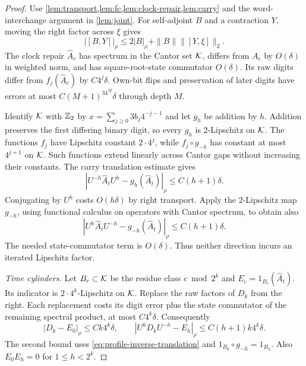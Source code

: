 \begin{proof}
Use \cref{lem:transport,lem:fc,lem:clock-repair,lem:carry} and the word-interchange argument in \cref{lem:joint}. For self-adjoint $B$ and a contraction $Y$, moving the right factor across $\xi$ gives
\[
 |[B,Y]|_\rho\le2|B|_\rho+\|B\|\|[Y,\xi]\|_2.
\]
The clock repair $\widehat A_c$ has spectrum in the Cantor set $\mathcal K$, differs from $A_c$ by $O(\delta)$ in weighted norm, and has square-root-state commutator $O(\delta)$. Its raw digits differ from $f_j(\widehat A_c)$ by $C4^j\delta$. Own-bit flips and preservation of later digits have errors at most $C(M+1)^34^M\delta$ through depth $M$.

Identify $\mathcal K$ with $\mathbb Z_2$ by $x=\sum_{j\ge0}3b_j4^{-j-1}$ and let $g_h$ be addition by $h$. Addition preserves the first differing binary digit, so every $g_h$ is 2-Lipschitz on $\mathcal K$. The functions $f_j$ have Lipschitz constant $2\cdot4^j$, while $f_j\circ g_{-h}$ has constant at most $4^{j+1}$ on $\mathcal K$. Such functions extend linearly across Cantor gaps without increasing their constants. The carry translation estimate gives
\[
 |U^{-h}\widehat A_tU^h-g_h(\widehat A_t)|_\rho\le C(h+1)\delta.
\]
Conjugating by $U^h$ costs $O(h\delta)$ by right transport. Apply the 2-Lipschitz map $g_{-h}$, using functional calculus on operators with Cantor spectrum, to obtain also
\begin{equation}\label{eq:profile-inverse-translation}
 |U^h\widehat A_tU^{-h}-g_{-h}(\widehat A_t)|_\rho\le C(h+1)\delta.
\end{equation}
The needed state-commutator term is $O(\delta)$. Thus neither direction incurs an iterated Lipschitz factor.

\par\smallskip\noindent\textit{Time cylinders.}\quad
Let $B_c\subset\mathcal K$ be the residue class $c\bmod2^k$ and $E_c=1_{B_c}(\widehat A_t)$. Its indicator is $2\cdot4^k$-Lipschitz on $\mathcal K$. Replace the raw factors of $D_k$ from the right. Each replacement costs its digit error plus the state commutator of the remaining spectral product, at most $C4^k\delta$. Consequently
\begin{equation}\label{eq:profile-time-cylinders}
 |D_k-E_0|_\rho\le Ck4^k\delta,\qquad
 |U^hD_kU^{-h}-E_h|_\rho\le C(h+1)k4^k\delta.
\end{equation}
The second bound uses \eqref{eq:profile-inverse-translation} and $1_{B_0}\circ g_{-h}=1_{B_h}$. Also $E_0E_h=0$ for $1\le h<2^k$.


\end{proof}
